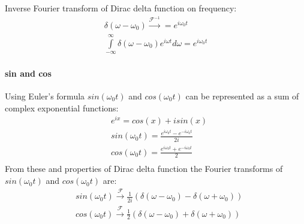 \documentclass{article}
\begin{document}


Inverse Fourier transform of Dirac delta function on frequency:
\begin{align*}
    \delta(\omega-\omega_0) \xrightarrow{\mathcal{F}^{-1}} = e^{i \omega_0 t}\\
    \int \limits^{\infty}_{-\infty} \delta(\omega-\omega_0) e^{i \omega t} d\omega = e^{i \omega_0 t}
\end{align*}

\paragraph{sin and cos}
Using Euler's formula $sin(\omega_0 t)$ and $cos(\omega_0 t)$ can be represented as a sum of complex exponential functions:
\begin{align*}
    &e^{ix} = cos(x) + i sin(x)\\
    &sin(\omega_0 t) = \frac{e^{i \omega_0 t} - e^{-i \omega_0 t}}{2i} \\
    &cos(\omega_0 t) = \frac{e^{i \omega_0 t} + e^{-i \omega_0 t}}{2} \\
\end{align*}
From these and properties of Dirac delta function the Fourier transforms of $sin(\omega_0 t)$ and $cos(\omega_0 t)$ are:
\begin{align*}
    &sin(\omega_0 t) \xrightarrow{\mathcal{F}} \frac{1}{2i} \left( \delta(\omega - \omega_0) - \delta(\omega + \omega_0) \right) \\
    &cos(\omega_0 t) \xrightarrow{\mathcal{F}} \frac{1}{2}  \left( \delta(\omega - \omega_0) + \delta(\omega + \omega_0) \right)\\
\end{align*}
\end{document}
